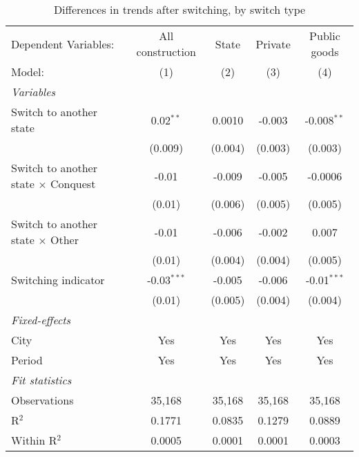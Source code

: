 \begin{table}[htbp]
   \caption{\label{tab:baseline_10y} Differences in trends after switching, by switch type}
   \centering
   \begin{tabular}{lcccc}
      \tabularnewline \midrule \midrule
      Dependent Variables:                       & All construction & State   & Private & Public goods\\  
      Model:                                     & (1)              & (2)     & (3)     & (4)\\  
      \midrule
      \emph{Variables}\\
      Switch to another state                    & 0.02$^{**}$      & 0.0010  & -0.003  & -0.008$^{**}$\\   
                                                 & (0.009)          & (0.004) & (0.003) & (0.003)\\   
      Switch to another state $\times$ Conquest  & -0.01            & -0.009  & -0.005  & -0.0006\\   
                                                 & (0.01)           & (0.006) & (0.005) & (0.005)\\   
      Switch to another state $\times$ Other     & -0.01            & -0.006  & -0.002  & 0.007\\   
                                                 & (0.01)           & (0.004) & (0.004) & (0.005)\\   
      Switching indicator                        & -0.03$^{***}$    & -0.005  & -0.006  & -0.01$^{***}$\\   
                                                 & (0.01)           & (0.005) & (0.004) & (0.004)\\   
      \midrule
      \emph{Fixed-effects}\\
      City                                       & Yes              & Yes     & Yes     & Yes\\  
      Period                                     & Yes              & Yes     & Yes     & Yes\\  
      \midrule
      \emph{Fit statistics}\\
      Observations                               & 35,168           & 35,168  & 35,168  & 35,168\\  
      R$^2$                                      & 0.1771           & 0.0835  & 0.1279  & 0.0889\\  
      Within R$^2$                               & 0.0005           & 0.0001  & 0.0001  & 0.0003\\  
      \midrule \midrule
      

\end{tabular}
\end{table}
